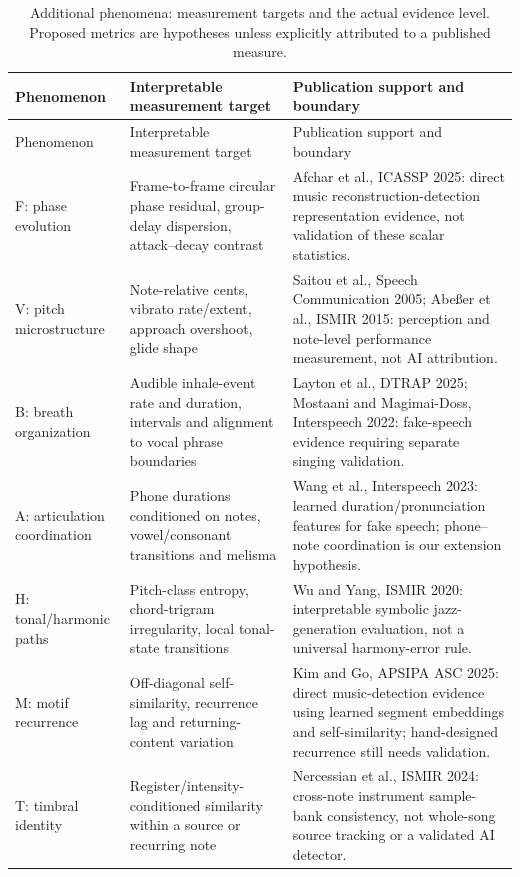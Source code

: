 \begin{longtable}{>{\raggedright\arraybackslash}p{29mm}>{\raggedright\arraybackslash}p{61mm}>{\raggedright\arraybackslash}p{59mm}}
\caption{Additional phenomena: measurement targets and the actual evidence level. Proposed metrics are hypotheses unless explicitly attributed to a published measure.}\\
\toprule Phenomenon & Interpretable measurement target & Publication support and boundary \\
\midrule\endfirsthead
\toprule Phenomenon & Interpretable measurement target & Publication support and boundary \\
\midrule\endhead
F: phase evolution & Frame-to-frame circular phase residual, group-delay dispersion, attack--decay contrast & Afchar et al., ICASSP 2025: direct music reconstruction-detection representation evidence, not validation of these scalar statistics. \\
V: pitch microstructure & Note-relative cents, vibrato rate/extent, approach overshoot, glide shape & Saitou et al., Speech Communication 2005; Abe\ss er et al., ISMIR 2015: perception and note-level performance measurement, not AI attribution. \\
B: breath organization & Audible inhale-event rate and duration, intervals and alignment to vocal phrase boundaries & Layton et al., DTRAP 2025; Mostaani and Magimai-Doss, Interspeech 2022: fake-speech evidence requiring separate singing validation. \\
A: articulation coordination & Phone durations conditioned on notes, vowel/consonant transitions and melisma & Wang et al., Interspeech 2023: learned duration/pronunciation features for fake speech; phone--note coordination is our extension hypothesis. \\
H: tonal/harmonic paths & Pitch-class entropy, chord-trigram irregularity, local tonal-state transitions & Wu and Yang, ISMIR 2020: interpretable symbolic jazz-generation evaluation, not a universal harmony-error rule. \\
M: motif recurrence & Off-diagonal self-similarity, recurrence lag and returning-content variation & Kim and Go, APSIPA ASC 2025: direct music-detection evidence using learned segment embeddings and self-similarity; hand-designed recurrence still needs validation. \\
T: timbral identity & Register/intensity-conditioned similarity within a source or recurring note & Nercessian et al., ISMIR 2024: cross-note instrument sample-bank consistency, not whole-song source tracking or a validated AI detector. \\
\bottomrule
\end{longtable}

